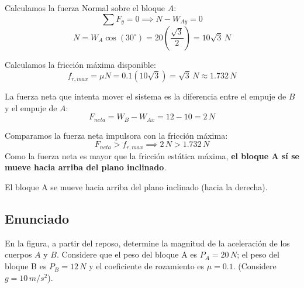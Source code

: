 \documentclass[12pt, a4paper]{article}
\begin{document}
Calculamos la fuerza Normal sobre el bloque $A$:
$$ \sum F_y = 0 \implies N - W_{Ay} = 0 $$
$$ N = W_A \cos(30^\circ) = 20 \left(\frac{\sqrt{3}}{2}\right) = 10\sqrt{3}\,\si{N} $$

Calculamos la fricción máxima disponible:
$$ f_{r,max} = \mu N = 0.1(10\sqrt{3}) = \sqrt{3}\,\si{N} \approx 1.732\,\si{N} $$

La fuerza neta que intenta mover el sistema es la diferencia entre el empuje de $B$ y el empuje de $A$:
$$ F_{neta} = W_B - W_{Ax} = 12 - 10 = 2\,\si{N} $$

Comparamos la fuerza neta impulsora con la fricción máxima:
$$ F_{neta} > f_{r,max} \implies 2\,\si{N} > 1.732\,\si{N} $$
Como la fuerza neta es mayor que la fricción estática máxima, \textbf{el bloque A sí se mueve hacia arriba del plano inclinado}.

\begin{tcolorbox}[colback=green!5!white, colframe=green!50!black, title=Respuesta Final]
\centering
El bloque A se mueve hacia arriba del plano inclinado (hacia la derecha).
\end{tcolorbox}

\newpage

\subsection*{Enunciado}
En la figura, a partir del reposo, determine la magnitud de la aceleración de los cuerpos $A$ y $B$. Considere que el peso del bloque A es $P_A = 20\,\si{N}$; el peso del bloque B es $P_B = 12\,\si{N}$ y el coeficiente de rozamiento es $\mu = 0.1$. (Considere $g = 10\,\si{m/s^2}$).

\begin{center}
\end{center}
\end{document}
